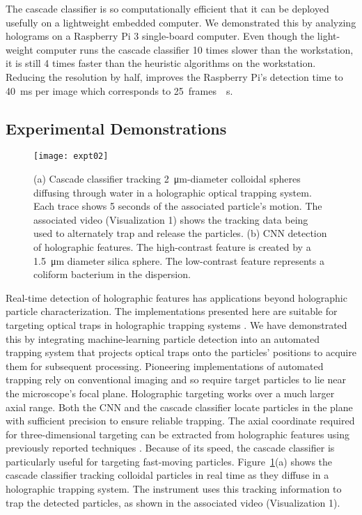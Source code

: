 \documentclass[10pt,letterpaper]{article}
\begin{document}
The cascade classifier is so computationally efficient
that it can be deployed usefully on a lightweight
embedded computer. 
We demonstrated this by analyzing holograms on
a Raspberry Pi 3 single-board computer.
Even though the light-weight computer runs the
cascade classifier \num{10} times slower than the
workstation,  it is still \num{4} times faster than the heuristic 
algorithms on the workstation.
Reducing the resolution by half, improves the 
Raspberry Pi's detection time to \SI{40}{\ms} per image 
which corresponds to \SI{25}{frames \per \second}.

\subsection{Experimental Demonstrations}
\label{sec:experiment}

\begin{figure}[!b]
  \centering
  \texttt{[image: expt02]}
  \caption{(a) Cascade classifier tracking \SI{2}{\um}-diameter
    colloidal spheres diffusing through water in a
    holographic optical trapping system.
    Each trace shows 5 seconds of the associated particle's motion.
    The associated video (Visualization 1) shows the tracking data
    being used to alternately trap and release the particles.
    (b) CNN detection of holographic features.
    The high-contrast feature is created by a \SI{1.5}{\um}
    diameter silica sphere.  The low-contrast feature
    represents a coliform bacterium in the dispersion.}
  \label{fig:autotrap}
\end{figure}

Real-time detection of holographic features has applications
beyond holographic particle characterization.
The implementations presented here are suitable for targeting
optical traps in holographic trapping systems \cite{grier03}.
We have demonstrated this by integrating machine-learning
particle detection into an automated trapping system that
projects optical traps onto the particles' positions to acquire
them for subsequent processing.
Pioneering implementations
of automated trapping \cite{chapin06} rely on conventional
imaging and so require target particles to lie near the microscope's
focal plane.
Holographic targeting works over a much larger axial
range.
Both the CNN and the cascade classifier
locate particles in the plane with sufficient precision to ensure
reliable trapping.
The axial coordinate required for three-dimensional targeting can
be extracted from holographic features using previously reported
techniques \cite{yevick14}.
Because of its speed, the cascade classifier is particularly useful
for targeting fast-moving particles.
Figure~\ref{fig:autotrap}(a) shows the cascade classifier tracking colloidal
particles in real time as they diffuse in a holographic trapping
system.
The instrument uses this tracking information to trap the
detected particles, as shown in the associated video
(Visualization 1).
\end{document}
